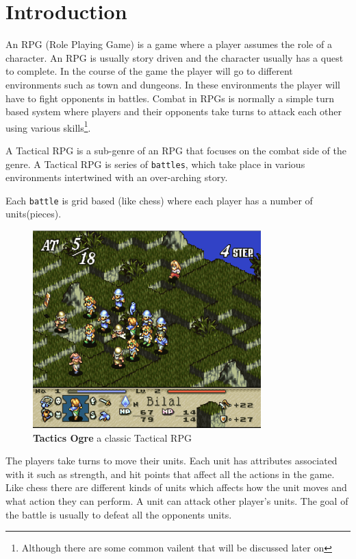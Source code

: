 
\section{Introduction} 
\label{introduction}
       
An RPG (Role Playing Game) is a game where a player assumes the role of a character. An RPG is usually story driven and the character usually has a quest to complete. In the course of the game the player will go to different environments such as town and dungeons. In these environments the player will have to fight opponents in battles. Combat in RPGs is normally a simple turn based system where players and their opponents take turns to attack each other using various skills\footnote{Although there are some common vailent that will be discussed later on}. 

A Tactical RPG is a sub-genre of an RPG that focuses on the combat side of the genre. A Tactical RPG is series of \texttt{battles}, which take place in various environments intertwined with an over-arching story.

Each \texttt{battle} is grid based (like chess) where each player has a number of units(pieces). 
\begin{figure}[htbp] \centering 
	\includegraphics[height=3in]{figures/TRPG.png} 
	\caption{\textbf{Tactics Ogre}\cite{to} a classic Tactical RPG } 
	\label{fig:TRPG} 
\end{figure}
The players take turns to move their units. Each unit has attributes associated with it such as strength, and hit points that affect all the actions in the game. Like chess there are different kinds of units which affects how the unit moves and what action they can perform. A unit can attack other player's units. The goal of the battle is usually to defeat all the opponents units.

